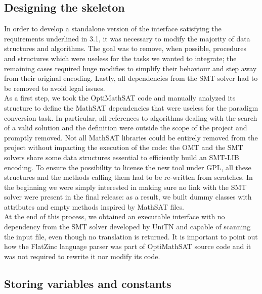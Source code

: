 \subsection{Designing the skeleton}

In order to develop a standalone version of the interface satisfying the requirements underlined in 3.1, it was necessary to modify the majority of data structures and algorithms. The goal was to remove, when possible, procedures and structures which were useless for the tasks we wanted to integrate; the remaining cases required huge modifies to simplify their behaviour and step away from their original encoding. Lastly, all dependencies from the SMT solver had to be removed to avoid legal issues. \\
As a first step, we took the OptiMathSAT code and manually analyzed its structure to define the MathSAT dependencies that were useless for the paradigm conversion task. In particular, all references to algorithms dealing with the search of a valid solution and the definition were outside the scope of the project and promptly removed. Not all MathSAT libraries could be entirely removed from the project without impacting the execution of the code: the OMT and the SMT solvers share some data structures essential to efficiently build an SMT-LIB encoding. To ensure the possibility to license the new tool under GPL, all these structures and the methods calling them had to be re-written from scratches. In the beginning we were simply interested in making sure no link with the SMT solver were present in the final release: as a result, we built dummy classes with attributes and empty methods inspired by MathSAT files. \\
At the end of this process, we obtained an executable interface with no dependency from the SMT solver developed by UniTN and capable of scanning the input file, even though no translation is returned.
It is important to point out how the FlatZinc language parser was part of OptiMathSAT source code and it was not required to rewrite it nor modify its code.

\subsection{Storing variables and constants}

